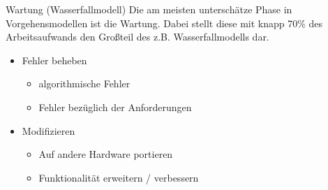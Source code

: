 \begin{bonus}{Wartung (Wasserfallmodell)}
    Die am meisten unterschätze Phase in Vorgehensmodellen ist die Wartung.
    Dabei stellt diese mit knapp 70\% des Arbeitsaufwands den Großteil des z.B. Wasserfallmodells dar.

    \begin{itemize}
        \item Fehler beheben
              \begin{itemize}
                  \item algorithmische Fehler
                  \item Fehler bezüglich der Anforderungen
              \end{itemize}
        \item Modifizieren
              \begin{itemize}
                  \item Auf andere Hardware portieren
                  \item Funktionalität erweitern / verbessern
              \end{itemize}
    \end{itemize}
\end{bonus}

